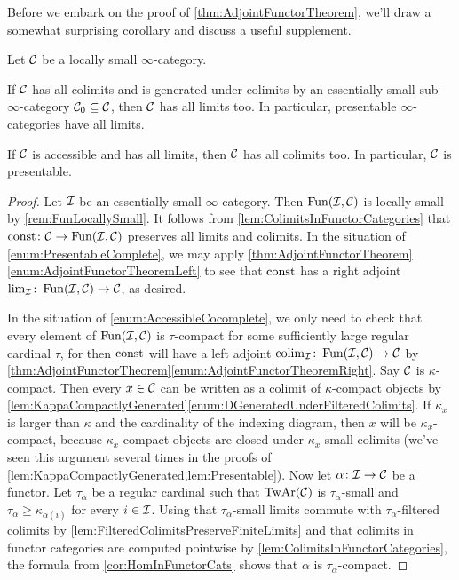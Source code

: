 Before we embark on the proof of \cref{thm:AdjointFunctorTheorem}, we'll draw a somewhat surprising corollary and discuss a useful supplement.
\begin{cor}\label{cor:PresentableComplete}
	Let $\mathcal{C}$ be a locally small $\infty$-category.
	\begin{alphanumerate}
		\item If $\mathcal{C}$ has all colimits and is generated under colimits by an essentially small sub-$\infty$-category $\mathcal{C}_0\subseteq \mathcal{C}$, then $\mathcal{C}$ has all limits too. In particular, presentable $\infty$-categories have all limits.\label{enum:PresentableComplete}
		\item If $\mathcal{C}$ is accessible and has all limits, then $\mathcal{C}$ has all colimits too. In particular, $\mathcal{C}$ is presentable.\label{enum:AccessibleCocomplete}
	\end{alphanumerate}
\end{cor}
\begin{proof}
	Let $\mathcal{I}$ be an essentially small $\infty$-category. Then $\operatorname{Fun}(\mathcal{I},\mathcal{C})$ is locally small by \cref{rem:FunLocallySmall}. It follows from \cref{lem:ColimitsInFunctorCategories} that $\operatorname{const}\colon \mathcal{C}\rightarrow\operatorname{Fun}(\mathcal{I},\mathcal{C})$ preserves all limits and colimits. In the situation of \cref{enum:PresentableComplete}, we may apply \cref{thm:AdjointFunctorTheorem}\cref{enum:AdjointFunctorTheoremLeft} to see that $\operatorname{const}$ has a right adjoint $\operatorname*{lim}_{\mathcal{I}}\colon \operatorname{Fun}(\mathcal{I},\mathcal{C})\rightarrow\mathcal{C}$, as desired.
	
	In the situation of \cref{enum:AccessibleCocomplete}, we only need to check that every element of $\operatorname{Fun}(\mathcal{I},\mathcal{C})$ is $\tau$-compact for some sufficiently large regular cardinal $\tau$, for then $\operatorname{const}$ will have a left adjoint $\operatorname*{colim}_{\mathcal{I}}\colon \operatorname{Fun}(\mathcal{I},\mathcal{C})\rightarrow\mathcal{C}$ by \cref{thm:AdjointFunctorTheorem}\cref{enum:AdjointFunctorTheoremRight}. Say $\mathcal{C}$ is $\kappa$-compact. Then every $x\in\mathcal{C}$ can be written as a colimit of $\kappa$-compact objects by \cref{lem:KappaCompactlyGenerated}\cref{enum:DGeneratedUnderFilteredColimits}. If $\kappa_x$ is larger than $\kappa$ and the cardinality of the indexing diagram, then $x$ will be $\kappa_x$-compact, because $\kappa_x$-compact objects are closed under $\kappa_x$-small colimits (we've seen this argument several times in the proofs of \cref{lem:KappaCompactlyGenerated,lem:Presentable}). Now let $\alpha\colon \mathcal{I}\rightarrow\mathcal{C}$ be a functor. Let $\tau_\alpha$ be a regular cardinal such that $\operatorname{TwAr}(\mathcal{C})$ is $\tau_\alpha$-small and $\tau_\alpha\geqslant \kappa_{\alpha(i)}$ for every $i\in\mathcal{I}$. Using that $\tau_\alpha$-small limits commute with $\tau_\alpha$-filtered colimits by \cref{lem:FilteredColimitsPreserveFiniteLimits} and that colimits in functor categories are computed pointwise by \cref{lem:ColimitsInFunctorCategories}, the formula from \cref{cor:HomInFunctorCats} shows that $\alpha$ is $\tau_\alpha$-compact.
\end{proof}
